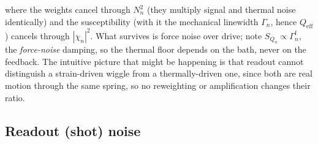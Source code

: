 \documentclass[11pt]{article}
\begin{document}
where the weights cancel through $N_n^2$ (they multiply signal and
thermal noise identically) and the susceptibility (with it the
mechanical linewidth $\Gamma_n$, hence $Q_{\mathrm{eff}}$) cancels
through $|\chi_n|^2$.
What survives is force noise over drive; note $S_{Q_n} \propto
\Gamma^{\mathrm{f}}_n$, the \emph{force-noise} damping, so the thermal
floor depends on the bath, never on the feedback. 
The intuitive picture that might be happening is that
readout cannot distinguish a strain-driven wiggle from a
thermally-driven one, since both are real motion through the same spring, 
so no reweighting or amplification changes their ratio.

\subsection{Readout (shot) noise}
\end{document}
